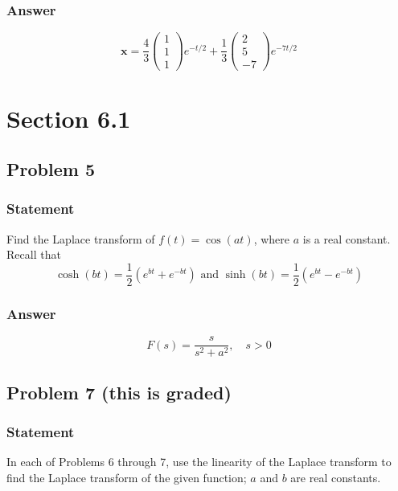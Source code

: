 \documentclass[12pt]{article}
\begin{document}
\subsubsection*{Answer}
\label{sec:orgec5e0a7}
\begin{equation*}
\mathbf{x}=\frac{4}{3}\left(\begin{array}{l}
1 \\
1 \\
1
\end{array}\right) e^{-t / 2}+\frac{1}{3}\left(\begin{array}{r}
2 \\
5 \\
-7
\end{array}\right) e^{-7 t / 2}
\end{equation*}
\section*{Section 6.1}
\label{sec:orgf00a6b1}
\subsection*{Problem 5}
\label{sec:org8b20d24}
\subsubsection*{Statement}
\label{sec:org2226b4a}
Find the Laplace transform of \(f(t)=\cos (a t)\), where \(a\) is a real
constant.
Recall that
\begin{equation*}
\cosh (b t)=\frac{1}{2}\left(e^{b t}+e^{-b t}\right) \text { and } \sinh (b t)=\frac{1}{2}\left(e^{b t}-e^{-b t}\right)
\end{equation*}
\subsubsection*{Answer}
\label{sec:org88fe813}
    \begin{equation*}
F(s)=\frac{s}{s^{2}+a^{2}}, \quad s>0
\end{equation*}
\subsection*{Problem 7 (this is graded)}
\label{sec:org2af9fd1}
\subsubsection*{Statement}
\label{sec:org80e0e8e}
In each of Problems 6 through 7, use the linearity of the Laplace transform to
find the Laplace transform of the given function; \(a\) and \(b\) are real
constants. 
\end{document}
